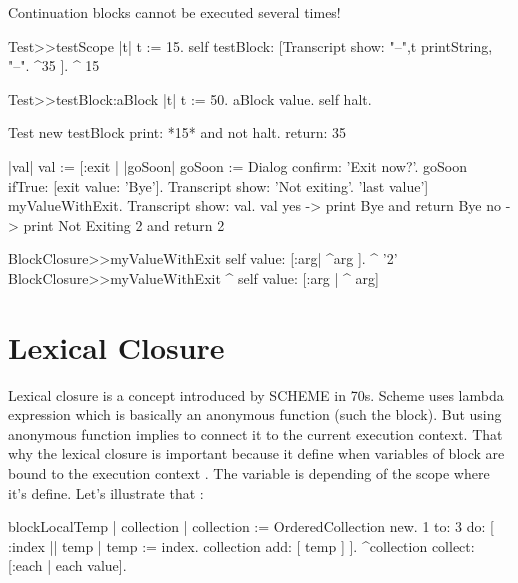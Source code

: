 \documentclass[a4paper,10pt,twoside]{book}
\begin{document}
Continuation blocks cannot be executed several times!

\begin{code}{}
Test>>testScope
	   |t|
    	t := 15.
	   self testBlock: [Transcript show: "--",t printString, "--".
	   ^35 ].
    ^ 15

Test>>testBlock:aBlock
	   |t|
	   t := 50.
	   aBlock value.
	   self halt.
\end{code}

\begin{code}{}
Test new testBlock 	
print: *15* and not halt. 
return: 35
\end{code}


\begin{code}{}
|val|
val := [:exit |
		|goSoon|
		goSoon := Dialog confirm: 'Exit now?'.
		goSoon ifTrue: [exit value: 'Bye'].
		Transcript show: 'Not exiting'.
		'last value'] myValueWithExit.
Transcript show: val.
val
yes -> print Bye and return  Bye
no -> print Not Exiting 2 and return 2
\end{code}

\begin{code}{}
BlockClosure>>myValueWithExit
	      self value: [:arg| ^arg ].
      ^ '2'
BlockClosure>>myValueWithExit
 ^ self value: [:arg | ^ arg]        
\end{code}


\section{Lexical Closure}


Lexical closure is a concept introduced by SCHEME in 70s. Scheme uses lambda expression which is basically an anonymous function (such the block). But using anonymous function implies to connect it to the current execution context. That why the lexical closure is important because it define when variables of block are bound to the execution context . The variable is depending of the scope where it's  define. Let's illustrate that :

\begin{code}{}
blockLocalTemp
	| collection |
		collection := OrderedCollection new.
		1 to: 3 do: [ :index || temp |
			temp := index. 
			collection add: [ temp ] ].
		^collection collect: [:each | each value].
\end{code}
\end{document}
